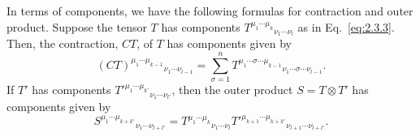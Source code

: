 In terms of components, we have the following formulas for contraction and outer
product.  Suppose the tensor \(T\) has components
\(T^{\mu_1\cdots\mu_k}{}_{\nu_1\cdots\nu_l}\) as in Eq.~\eqref{eq:2.3.3}.  Then,
the contraction, \(CT\), of \(T\) has components given by
\begin{equation}
  (CT)^{\mu_1\cdots\mu_{k-1}}{}_{\nu_1\cdots\nu_{l-1}}
  =\sum_{\sigma=1}^n
  T^{\mu_1\cdots\sigma\cdots\mu_{k-1}}{}_{
    \nu_1\cdots\sigma\cdots\nu_{l-1}} .
  \tag{2.3.4}\label{eq:2.3.4}
\end{equation}
If \(T'\) has components
\(T'^{\mu_1\cdots\mu_{k'}}{}_{\nu_1\cdots\nu_{l'}}\), then the outer product
\(S=T\otimes T'\) has components given by
\begin{equation}
  S^{\mu_1\cdots\mu_{k+k'}}{}_{\nu_1\cdots\nu_{l+l'}}
  =T^{\mu_1\cdots\mu_k}{}_{\nu_1\cdots\nu_l}
  T'^{\mu_{k+1}\cdots\mu_{k+k'}}{}_{\nu_{l+1}\cdots\nu_{l+l'}} .
  \tag{2.3.5}\label{eq:2.3.5}
\end{equation}

